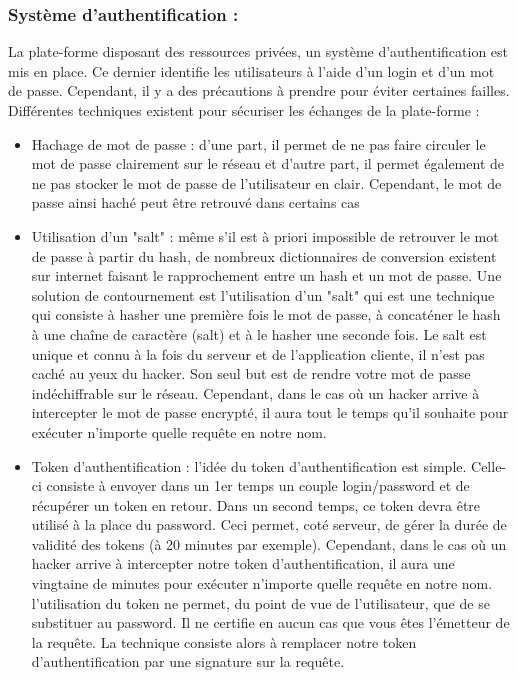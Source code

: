 \documentclass{report}
\begin{document}
\subsubsection{Système d'authentification :}
La plate-forme disposant des ressources privées, un système d'authentification est mis en place. Ce dernier identifie les utilisateurs à l'aide d'un login et d'un mot de passe. Cependant, il y a des précautions à prendre pour éviter certaines 
failles. Différentes techniques existent pour sécuriser les échanges de la plate-forme :

\begin{itemize}
\item Hachage de mot de passe : d'une part, il permet de ne pas faire circuler le mot de passe clairement sur le réseau et 
d'autre part, il permet également de ne pas stocker le mot de passe de l’utilisateur en clair. Cependant, le mot de passe ainsi haché peut être retrouvé dans certains cas
\item Utilisation d’un "salt" : même s'il est à priori impossible de retrouver le mot de passe à partir du hash, de 
nombreux dictionnaires de conversion existent sur internet faisant le rapprochement entre un hash et un mot de passe.
Une solution de contournement est l'utilisation d'un "salt" qui est une technique qui consiste à hasher une première fois 
le mot de passe, à concaténer le hash à une chaîne de caractère (salt) et à le hasher une seconde fois. Le salt est unique 
et connu à la fois du serveur et de l’application cliente, il n’est pas caché au yeux du hacker. Son seul but est de rendre 
votre mot de passe indéchiffrable sur le réseau. Cependant, dans le cas où un hacker arrive à intercepter le mot de passe encrypté, il aura tout le temps qu’il souhaite pour exécuter n’importe quelle requête en notre nom.
\item Token d’authentification : l’idée du token d’authentification est simple. Celle-ci consiste à envoyer dans un 1er temps un couple login/password et de récupérer un token en retour. Dans un second temps, ce token devra être utilisé 
à la place du password. Ceci permet, coté serveur, de gérer la durée de validité des tokens (à 20 minutes par exemple). 
Cependant, dans le cas où un hacker arrive à intercepter notre token d’authentification, il aura une vingtaine de 
minutes pour exécuter n’importe quelle requête en notre nom. l’utilisation du token ne permet, du point de vue de l’utilisateur, que de se substituer au password. Il ne certifie en aucun cas que vous êtes l’émetteur de la requête. La technique consiste alors à remplacer notre token d’authentification par une signature sur la requête. 

\end{itemize}
\end{document}
